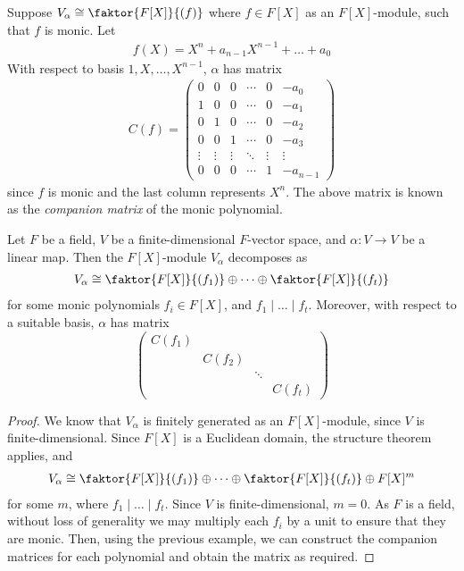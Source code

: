 \begin{example}
	Suppose $V_\alpha \cong \faktor{F[X]}{(f)}$ where $f \in F[X]$ as an $F[X]$-module, such that $f$ is monic.
	Let
	\begin{align*}
		f(X) = X^n + a_{n-1} X^{n-1} + \dots + a_0
	\end{align*}
	With respect to basis $1, X, \dots, X^{n-1}$, $\alpha$ has matrix
	\begin{align*}
		C(f) =
		\begin{pmatrix}
			0      & 0      & 0      & \cdots & 0      & -a_0     \\
			1      & 0      & 0      & \cdots & 0      & -a_1     \\
			0      & 1      & 0      & \cdots & 0      & -a_2     \\
			0      & 0      & 1      & \cdots & 0      & -a_3     \\
			\vdots & \vdots & \vdots & \ddots & \vdots & \vdots   \\
			0      & 0      & 0      & \cdots & 1      & -a_{n-1}
		\end{pmatrix}
	\end{align*}
	since $f$ is monic and the last column represents $X^n$.
	The above matrix is known as the \textit{companion matrix} of the monic polynomial.
\end{example}
\begin{theorem}
	Let $F$ be a field, $V$ be a finite-dimensional $F$-vector space, and $\alpha \colon V \to V$ be a linear map.
	Then the $F[X]$-module $V_\alpha$ decomposes as
	\begin{align*}
		V_\alpha \cong \faktor{F[X]}{(f_1)} \oplus \dots \oplus \faktor{F[X]}{(f_t)}
	\end{align*}
	for some monic polynomials $f_i \in F[X]$, and $f_1 \mid \dots \mid f_t$.
	Moreover, with respect to a suitable basis, $\alpha$ has matrix
	\begin{equation}
		\begin{pmatrix}
			C(f_1)                      \\
			 & C(f_2)                   \\
			 &        & \ddots          \\
			 &        &        & C(f_t)
		\end{pmatrix}
		\tag{\(\ast\ast\)}
	\end{equation}
\end{theorem}
\begin{proof}
	We know that $V_\alpha$ is finitely generated as an $F[X]$-module, since $V$ is finite-dimensional.
	Since $F[X]$ is a Euclidean domain, the structure theorem applies, and
	\begin{align*}
		V_\alpha \cong \faktor{F[X]}{(f_1)} \oplus \dots \oplus \faktor{F[X]}{(f_t)} \oplus F[X]^m
	\end{align*}
	for some $m$, where $f_1 \mid \dots \mid f_t$.
	Since $V$ is finite-dimensional, $m = 0$.
	As $F$ is a field, without loss of generality we may multiply each $f_i$ by a unit to ensure that they are monic.
	Then, using the previous example, we can construct the companion matrices for each polynomial and obtain the matrix as required.
\end{proof}
